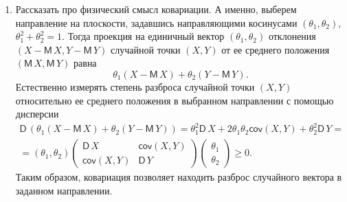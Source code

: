 \documentclass[14pt]{extarticle}
\newcommand{\M}{{\mathsf M}\,}
\newcommand{\cov}{\mathsf{cov}}
\newcommand{\var}{\mathsf{D}\,}
\theoremstyle{theorem}
\theoremstyle{remark}
\begin{document}
\begin{enumerate}
    \item Рассказать про физический смысл ковариации. А именно, выберем направление на плоскости, задавшись направляющими
косинусами $(\theta_1, \theta_2)$, $\theta^2_1+\theta_2^2=1$. Тогда проекция на единичный
вектор $(\theta_1, \theta_2)$ отклонения $(X-\M X, Y-\M Y)$ случайной точки $(X,Y)$ от ее
среднего положения $(\M X, \M Y)$ равна
\[
\theta_1(X-\M X)+ \theta_2( Y-\M Y).
\]
Естественно измерять степень разброса случайной точки $(X, Y)$ относительно ее среднего
положения в выбранном направлении с помощью дисперсии
\begin{multline*}
\var(\theta_1(X-\M X)+ \theta_2( Y-\M Y)) = \theta_1^2 \var X +
2\theta_1\theta_2\cov(X,Y)+ \theta_2^2 \var Y =
 \\ =
 (\theta_1, \theta_2) 
 \begin{pmatrix}
   \var X & \cov(X,Y)\\
   \cov(X,Y) & \var Y
 \end{pmatrix}
 \begin{pmatrix}\theta_1\\ \theta_2
 \end{pmatrix} \geqslant 0.
\end{multline*}
Таким образом, ковариация позволяет находить разброс случайного вектора в заданном
направлении. 


\end{enumerate}
\end{document}
